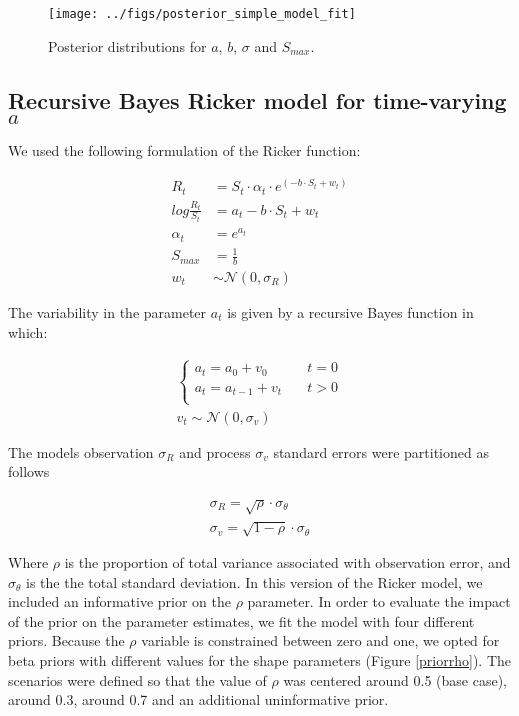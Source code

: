 \documentclass{article}
\begin{document}
\begin{figure}[ht]
  \centering
  \texttt{[image: ../figs/posterior\_simple\_model\_fit]}
  \caption{Posterior distributions for $a$, $b$, $\sigma$ and $S_{max}$. }
\label{posterior_simple}
\end{figure}


\subsection{Recursive Bayes Ricker model for time-varying $a$}

We used the following formulation of the Ricker function:

\begin{align} 
R_t &= S_t \cdot \alpha_t \cdot e^{(-b\cdot S_t + w_t)}   \\ 
log\frac{R_t}{S_t} &= a_t-b\cdot S_t + w_t\\
\alpha_t &= e^{a_t} \\
S_{max} &= \frac{1}{b} \\
w_t &\sim \mathcal{N}(0,\sigma_R)
\end{align}


The variability in the parameter $a_t$ is given by a recursive Bayes function in which:

\begin{align} 
\begin{cases}
a_t = a_0 + v_0 &\quad t=0 \\
a_t = a_{t-1} + v_t &\quad t>0 \\
\end{cases}\\
v_t \sim \mathcal{N}(0,\sigma_v)
\end{align}

The models observation $\sigma_{R}$ and  process $\sigma_{v}$ standard errors were partitioned as follows


\begin{align} 
\sigma_{R}      = \sqrt{\rho} \cdot \sigma_{\theta}\\
\sigma_v        = \sqrt{1-\rho} \cdot \sigma_{\theta} 
\end{align}

Where $\rho$ is the proportion of total variance associated with observation error, and $\sigma_{\theta} $ is the the total standard deviation. In this version of the Ricker model, we included an informative prior on the $\rho$ parameter. In order to evaluate the impact of the prior on the parameter estimates, we fit the model with four different priors. Because the $\rho$ variable is constrained between zero and one, we opted for beta priors with different values for the shape parameters (Figure \ref{priorrho}). The scenarios were defined so that the value of $\rho$ was centered around 0.5 (base case), around 0.3, around 0.7 and an additional uninformative prior. 
\end{document}
